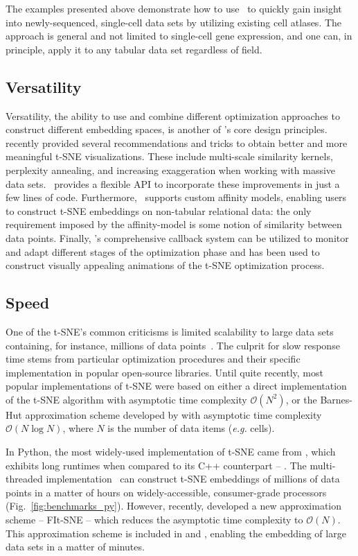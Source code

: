 \documentclass[article]{jss}
\newcommand{\opentsne}{\pkg{openTSNE}}
\begin{document}
The examples presented above demonstrate how to use \opentsne\ to quickly gain
insight into newly-sequenced, single-cell data sets by utilizing existing cell
atlases. The approach is general and not limited to single-cell gene expression,
and one can, in principle, apply it to any tabular data set regardless of field.

\subsection{Versatility}

Versatility, the ability to use and combine different optimization approaches to
construct different embedding spaces, is another of \opentsne's core design
principles. \citet{kobak2019art} recently provided several recommendations and
tricks to obtain better and more meaningful t-SNE visualizations. These include
multi-scale similarity kernels, perplexity annealing, and increasing
exaggeration when working with massive data sets. \opentsne\ provides a flexible
API to incorporate these improvements in just a few lines of code. Furthermore,
\opentsne\ supports custom affinity models, enabling users to construct t-SNE
embeddings on non-tabular relational data: the only requirement imposed by the
affinity-model is some notion of similarity between data points. Finally,
\opentsne's comprehensive callback system can be utilized to monitor and adapt
different stages of the optimization phase and has been used to construct
visually appealing animations of the t-SNE optimization process.

\subsection{Speed}

One of the t-SNE's common criticisms is limited scalability to large data sets
containing, for instance, millions of data
points~\citep{becht2019dimensionality}. The culprit for slow response time stems
from particular optimization procedures and their specific implementation in
popular open-source libraries. Until quite recently, most popular implementations of
t-SNE were based on either a direct implementation of the t-SNE algorithm with asymptotic time complexity $\mathcal{O}(N^2)$, or the Barnes-Hut approximation scheme developed by
\citet{van2014accelerating} with asymptotic time complexity $\mathcal{O}(N \log
N)$, where $N$ is the number of data items ({\em e.g.} cells).

In Python, the most
widely-used implementation of t-SNE came from , which exhibits
long runtimes when compared to its C++ counterpart -- . The
multi-threaded  implementation~\citep{Ulyanov2016} can
construct t-SNE embeddings of millions of data points in a matter of hours on
widely-accessible, consumer-grade processors (Fig.~\ref{fig:benchmarks_py}).
However, recently, \citet{linderman2019fast} developed a new approximation
scheme -- FIt-SNE -- which reduces the asymptotic time complexity to
$\mathcal{O}(N)$. This approximation scheme is included in  and \opentsne, enabling the embedding of large data sets in a matter of minutes.
\end{document}
